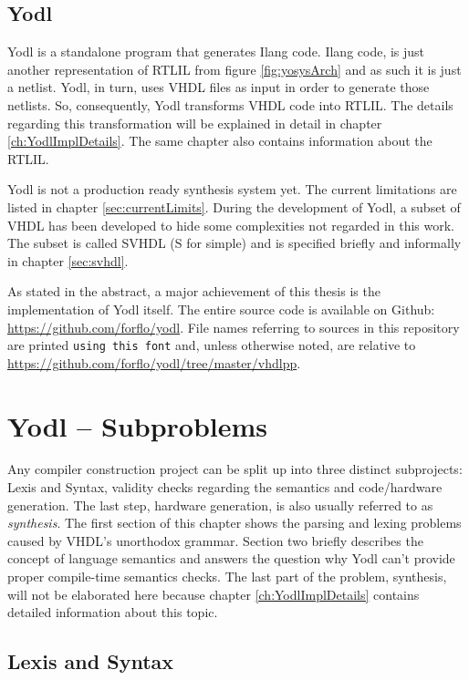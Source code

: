 \section{Yodl}
\label{sec:Yodl}

Yodl is a standalone program that generates Ilang code. Ilang code, is
just another representation of RTLIL from figure \ref{fig:yosysArch}
and as such it is just a netlist. Yodl, in turn, uses VHDL files as
input in order to generate those netlists. So, consequently, Yodl
transforms VHDL code into RTLIL. The details regarding this
transformation will be explained in detail in chapter
\ref{ch:YodlImplDetails}. The same chapter also contains information
about the RTLIL.

Yodl is not a production ready synthesis system yet. The current
limitations are listed in chapter \ref{sec:currentLimits}. During the
development of Yodl, a subset of VHDL has been developed to hide some
complexities not regarded in this work. The subset is called SVHDL (S
for simple) and is specified briefly and informally in chapter
\ref{sec:svhdl}.

As stated in the abstract, a major achievement of this thesis is the
implementation of Yodl itself. The entire source code is available
on Github: \url{https://github.com/forflo/yodl}. File names referring
to sources in this repository are printed \texttt{using this font} and,
unless otherwise noted, are relative to
\url{https://github.com/forflo/yodl/tree/master/vhdlpp}.

\chapter{Yodl -- Subproblems}
\label{ch:YodlSubproblems}

Any compiler construction project can be split up into three distinct
subprojects: Lexis and Syntax, validity checks regarding the semantics
and code/hardware generation. The last step, hardware generation, is
also usually referred to as \emph{synthesis}. The first section of this
chapter shows the parsing and lexing problems caused by VHDL's
unorthodox grammar. Section two briefly describes the concept of
language
semantics and answers the question why Yodl can't provide proper
compile-time semantics checks. The last part of the problem,
synthesis, will not be elaborated here because chapter
\ref{ch:YodlImplDetails} contains detailed information about this topic.

\section{Lexis and Syntax}
\label{sec:LexisAndSyntax}


